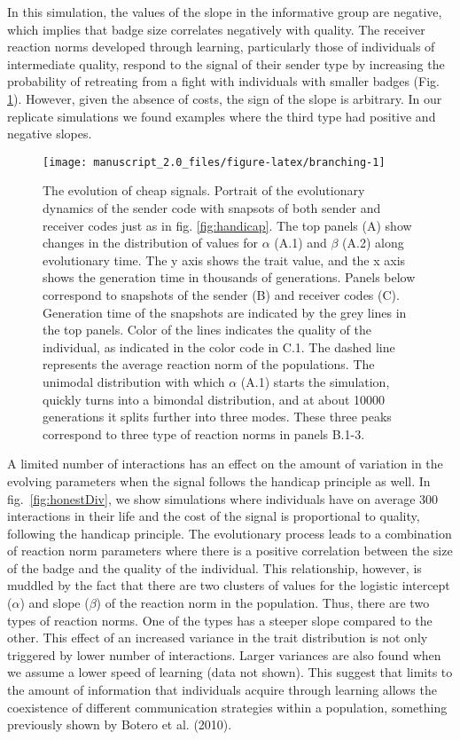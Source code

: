 \documentclass[
  12pt,
]{article}
\begin{document}
In this simulation, the values of the slope in the informative group are
negative, which implies that badge size correlates negatively with
quality. The receiver reaction norms developed through learning,
particularly those of individuals of intermediate quality, respond to
the signal of their sender type by increasing the probability of
retreating from a fight with individuals with smaller badges (Fig.
\ref{fig:branching}). However, given the absence of costs, the sign of
the slope is arbitrary. In our replicate simulations we found examples
where the third type had positive and negative slopes.

\begin{figure}

{\centering \texttt{[image: manuscript\_2.0\_files/figure-latex/branching-1]} 

}

\caption{The evolution of cheap signals. Portrait of the evolutionary dynamics of the sender code with snapsots of both sender and receiver codes just as in fig. \ref{fig:handicap}. The top panels (A) show changes in the distribution of values for $\alpha$ (A.1) and $\beta$ (A.2) along evolutionary time. The y axis shows the trait value, and  the x axis shows the generation time in thousands of generations. Panels below correspond to snapshots of the sender (B) and receiver codes (C). Generation time of the snapshots are indicated by the grey lines in the top panels. Color of the lines indicates the quality of the individual, as indicated in the color code in C.1. The dashed line represents the average reaction norm of the populations. The unimodal distribution with which $\alpha$ (A.1) starts the simulation, quickly turns into a bimondal distribution, and at about 10000 generations it splits further into three modes. These three peaks correspond to three type of reaction norms in panels B.1-3.}\label{fig:branching}
\end{figure}

A limited number of interactions has an effect on the amount of
variation in the evolving parameters when the signal follows the
handicap principle as well. In fig.~\ref{fig:honestDiv}, we show
simulations where individuals have on average 300 interactions in their
life and the cost of the signal is proportional to quality, following
the handicap principle. The evolutionary process leads to a combination
of reaction norm parameters where there is a positive correlation
between the size of the badge and the quality of the individual. This
relationship, however, is muddled by the fact that there are two
clusters of values for the logistic intercept (\(\alpha\)) and slope
(\(\beta\)) of the reaction norm in the population. Thus, there are two
types of reaction norms. One of the types has a steeper slope compared
to the other. This effect of an increased variance in the trait
distribution is not only triggered by lower number of interactions.
Larger variances are also found when we assume a lower speed of learning
(data not shown). This suggest that limits to the amount of information
that individuals acquire through learning allows the coexistence of
different communication strategies within a population, something
previously shown by Botero et al. (2010).
\end{document}
